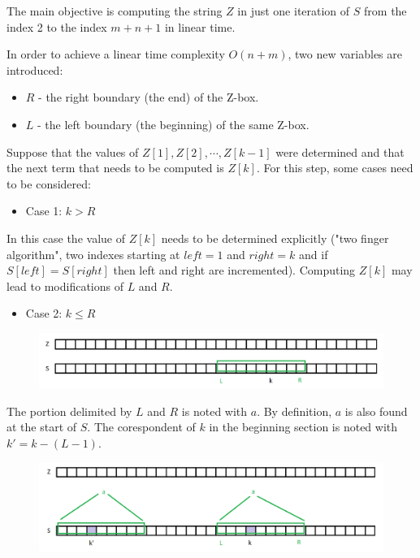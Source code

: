 \documentclass[letterpaper]{article}
\begin{document}
The main objective is computing the string $Z$ in just one iteration of $S$ from the index 2 to the index $m + n + 1$ in linear time.

In order to achieve a linear time complexity $O(n + m)$, two new variables are introduced:

\begin{itemize}
    \item $R$ - the right boundary (the end) of the Z-box.
    \item $L$ - the left boundary (the beginning) of the same Z-box.
\end{itemize}

Suppose that the values of $Z[1], Z[2], \cdots ,Z[k - 1]$ were determined and that the next term that needs to be computed is $Z[k]$. For this step, some cases need to be considered:

\begin{itemize}
    \item Case 1: $k > R$
\end{itemize}

In this case the value of $Z[k]$ needs to be determined explicitly ("two finger algorithm", two indexes starting at $left = 1$ and $right = k$ and if $S[left] = S[right]$ then left and right are incremented). Computing $Z[k]$ may lead to modifications of $L$ and $R$.

\begin{itemize}
    \item Case 2: $k \leq R$
\end{itemize}

\begin{figure} [h!]
\centering
\includegraphics[width=1\textwidth]{pngOfDiagrams/zalgo1.png}
\end{figure}

The portion delimited by $L$ and $R$ is noted with $a$. By definition, $a$ is also found at the start of $S$. The corespondent of $k$ in the beginning section is noted with $k' = k - (L - 1)$.

\begin{figure} [h!]
\centering
\includegraphics[width=1\textwidth]{pngOfDiagrams/zalgo2.png}
\end{figure}
\end{document}
